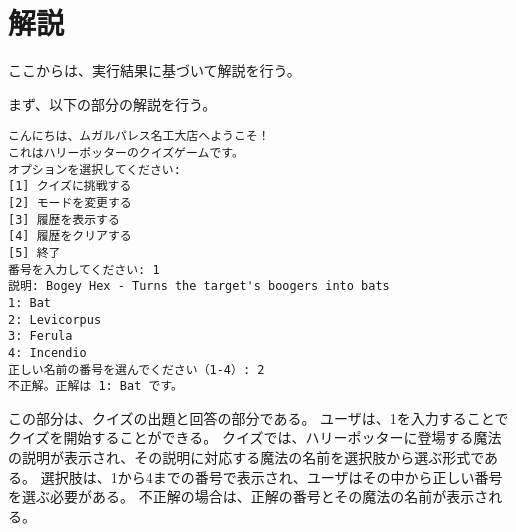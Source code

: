 \documentclass[uplatex,dvipdfmx,a4paper]{jsarticle}
\begin{document}
\section{解説}

ここからは、実行結果に基づいて解説を行う。
\par まず、以下の部分の解説を行う。
\begin{lstlisting}[style=result]
こんにちは、ムガルパレス名工大店へようこそ！
これはハリーポッターのクイズゲームです。
オプションを選択してください:
[1] クイズに挑戦する
[2] モードを変更する
[3] 履歴を表示する
[4] 履歴をクリアする
[5] 終了
番号を入力してください: 1
説明: Bogey Hex - Turns the target's boogers into bats
1: Bat
2: Levicorpus
3: Ferula
4: Incendio
正しい名前の番号を選んでください（1-4）: 2
不正解。正解は 1: Bat です。
\end{lstlisting}
この部分は、クイズの出題と回答の部分である。
ユーザは、1を入力することでクイズを開始することができる。
クイズでは、ハリーポッターに登場する魔法の説明が表示され、その説明に対応する魔法の名前を選択肢から選ぶ形式である。
選択肢は、1から4までの番号で表示され、ユーザはその中から正しい番号を選ぶ必要がある。
不正解の場合は、正解の番号とその魔法の名前が表示される。
\end{document}
